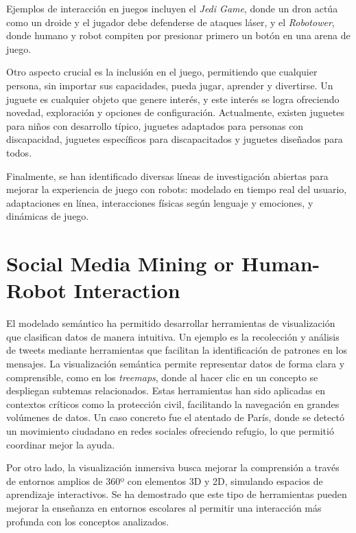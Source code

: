 Ejemplos de interacción en juegos incluyen el \textit{Jedi Game}, donde un dron actúa como un droide y el jugador debe defenderse de ataques láser, y el \textit{Robotower}, donde humano y robot compiten por presionar primero un botón en una arena de juego. 

Otro aspecto crucial es la inclusión en el juego, permitiendo que cualquier persona, sin importar sus capacidades, pueda jugar, aprender y divertirse. Un juguete es cualquier objeto que genere interés, y este interés se logra ofreciendo novedad, exploración y opciones de configuración. Actualmente, existen juguetes para niños con desarrollo típico, juguetes adaptados para personas con discapacidad, juguetes específicos para discapacitados y juguetes diseñados para todos.

Finalmente, se han identificado diversas líneas de investigación abiertas para mejorar la experiencia de juego con robots: modelado en tiempo real del usuario, adaptaciones en línea, interacciones físicas según lenguaje y emociones, y dinámicas de juego.  
\newpage

\section{Social Media Mining or Human-Robot Interaction}
El modelado semántico ha permitido desarrollar herramientas de visualización que clasifican datos de manera intuitiva. Un ejemplo es la recolección y análisis de tweets mediante herramientas que facilitan la identificación de patrones en los mensajes. La visualización semántica permite representar datos de forma clara y comprensible, como en los \textit{treemaps}, donde al hacer clic en un concepto se despliegan subtemas relacionados. Estas herramientas han sido aplicadas en contextos críticos como la protección civil, facilitando la navegación en grandes volúmenes de datos. Un caso concreto fue el atentado de París, donde se detectó un movimiento ciudadano en redes sociales ofreciendo refugio, lo que permitió coordinar mejor la ayuda.

Por otro lado, la visualización inmersiva busca mejorar la comprensión a través de entornos amplios de 360º con elementos 3D y 2D, simulando espacios de aprendizaje interactivos. Se ha demostrado que este tipo de herramientas pueden mejorar la enseñanza en entornos escolares al permitir una interacción más profunda con los conceptos analizados.

